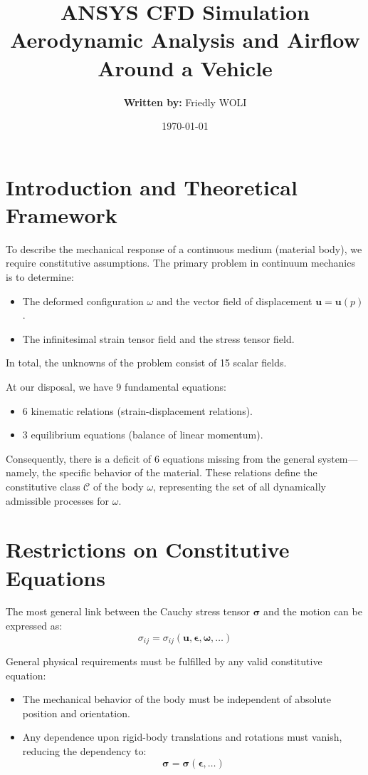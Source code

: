 \documentclass[12pt, a4paper]{article}
\title{\textbf{ANSYS CFD Simulation} \\ 
	\large Aerodynamic Analysis and Airflow Around a Vehicle}
\author{\textbf{Written by:} Friedly WOLI}
\date{\today}
\begin{document}
	
	\maketitle
	\thispagestyle{fancy}
	
	\section{Introduction and Theoretical Framework}
	
	To describe the mechanical response of a continuous medium (material body), we require constitutive assumptions. The primary problem in continuum mechanics is to determine:
	\begin{itemize}
		\item The deformed configuration $\omega$ and the vector field of displacement $\mathbf{u} = \mathbf{u}(p)$.
		\item The infinitesimal strain tensor field and the stress tensor field.
	\end{itemize}
	In total, the unknowns of the problem consist of 15 scalar fields. 
	
	At our disposal, we have 9 fundamental equations:
	\begin{itemize}
		\item 6 kinematic relations (strain-displacement relations).
		\item 3 equilibrium equations (balance of linear momentum).
	\end{itemize}
	
	Consequently, there is a deficit of 6 equations missing from the general system—namely, the specific behavior of the material. These relations define the constitutive class $\mathcal{C}$ of the body $\omega$, representing the set of all dynamically admissible processes for $\omega$.
	
	\section{Restrictions on Constitutive Equations}
	
	The most general link between the Cauchy stress tensor $\boldsymbol{\sigma}$ and the motion can be expressed as:
	\begin{equation}
		\sigma_{ij} = \sigma_{ij}(\mathbf{u}, \boldsymbol{\epsilon}, \boldsymbol{\omega}, \dots)
	\end{equation}
	
	General physical requirements must be fulfilled by any valid constitutive equation:
	\begin{itemize}
		\item The mechanical behavior of the body must be independent of absolute position and orientation.
		\item Any dependence upon rigid-body translations and rotations must vanish, reducing the dependency to:
		\begin{equation}
			\boldsymbol{\sigma} = \boldsymbol{\sigma}(\boldsymbol{\epsilon}, \dots)
		\end{equation}
	\end{itemize}
	
\end{document}
